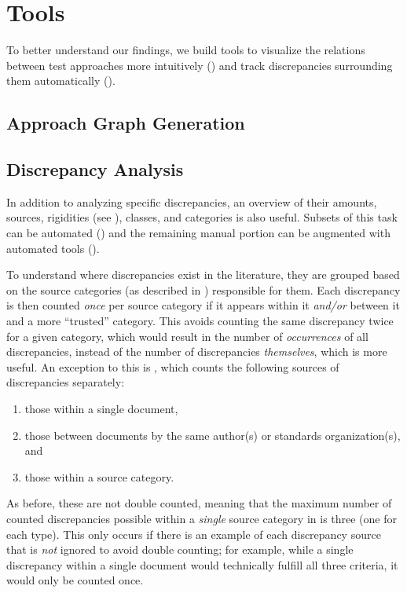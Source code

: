 \section{Tools}
\label{tools}

To better understand our findings, we build tools to visualize the
relations between test approaches more intuitively () and track
discrepancies surrounding them automatically ().

\subsection{Approach Graph Generation}
\label{graph-gen}

\graphGenDesc{}

\subsection{Discrepancy Analysis}
\label{discrep-analysis}

In addition to analyzing specific discrepancies, an overview of their amounts,
sources, rigidities (see ), classes, and categories is
also useful. Subsets of this task can be automated ()
and the remaining manual portion can be augmented with automated
tools ().

To understand where discrepancies exist in the literature, they are
grouped based on the source categories (as described in )
responsible for them. Each discrepancy is then counted \emph{once} per source
category if it appears within it \emph{and/or} between it and a more
``trusted'' category. This avoids counting the same discrepancy twice for a
given category, which would result in the number of
\emph{occurrences} of all discrepancies, instead of the number of discrepancies
\emph{themselves}, which is more useful. An exception to this is
, which counts the following sources of discrepancies
separately:
\begin{enumerate}
    \item those within a single document,
    \item those between documents by the same author(s) or standards
          organization(s), and
    \item those within a source category.
\end{enumerate}
As before, these are not double counted, meaning that the maximum number of
counted discrepancies possible within a \emph{single} source category in
 is three (one for each type). This only occurs if
there is an example of each discrepancy source that is \emph{not} ignored to
avoid double counting; for example, while a single discrepancy within a single
document would technically fulfill all three criteria, it would only be counted
once.

